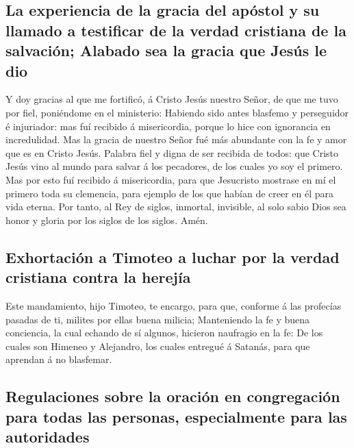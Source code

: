 \hypertarget{la-experiencia-de-la-gracia-del-apuxf3stol-y-su-llamado-a-testificar-de-la-verdad-cristiana-de-la-salvaciuxf3n-alabado-sea-la-gracia-que-jesuxfas-le-dio}{%
\subsection{La experiencia de la gracia del apóstol y su llamado a
testificar de la verdad cristiana de la salvación; Alabado sea la gracia
que Jesús le
dio}\label{la-experiencia-de-la-gracia-del-apuxf3stol-y-su-llamado-a-testificar-de-la-verdad-cristiana-de-la-salvaciuxf3n-alabado-sea-la-gracia-que-jesuxfas-le-dio}}

 Y doy gracias al que me fortificó, á Cristo Jesús
nuestro Señor, de que me tuvo por fiel, poniéndome en el ministerio:
 Habiendo sido antes blasfemo y perseguidor é injuriador:
mas fuí recibido á misericordia, porque lo hice con ignorancia en
incredulidad.  Mas la gracia de nuestro Señor fué más
abundante con la fe y amor que es en Cristo Jesús. 
Palabra fiel y digna de ser recibida de todos: que Cristo Jesús vino al
mundo para salvar á los pecadores, de los cuales yo soy el primero.
 Mas por esto fuí recibido á misericordia, para que
Jesucristo mostrase en mí el primero toda su clemencia, para ejemplo de
los que habían de creer en él para vida eterna.  Por
tanto, al Rey de siglos, inmortal, invisible, al solo sabio Dios sea
honor y gloria por los siglos de los siglos. Amén.

\hypertarget{exhortaciuxf3n-a-timoteo-a-luchar-por-la-verdad-cristiana-contra-la-herejuxeda}{%
\subsection{Exhortación a Timoteo a luchar por la verdad cristiana
contra la
herejía}\label{exhortaciuxf3n-a-timoteo-a-luchar-por-la-verdad-cristiana-contra-la-herejuxeda}}

 Este mandamiento, hijo Timoteo, te encargo, para que,
conforme á las profecías pasadas de ti, milites por ellas buena milicia;
 Manteniendo la fe y buena conciencia, la cual echando de
sí algunos, hicieron naufragio en la fe:  De los cuales
son Himeneo y Alejandro, los cuales entregué á Satanás, para que
aprendan á no blasfemar.

\hypertarget{regulaciones-sobre-la-oraciuxf3n-en-congregaciuxf3n-para-todas-las-personas-especialmente-para-las-autoridades}{%
\subsection{Regulaciones sobre la oración en congregación para todas las
personas, especialmente para las
autoridades}\label{regulaciones-sobre-la-oraciuxf3n-en-congregaciuxf3n-para-todas-las-personas-especialmente-para-las-autoridades}}


